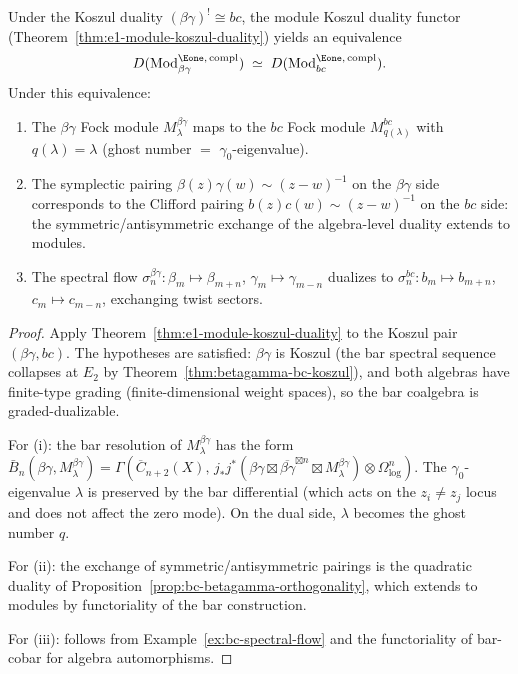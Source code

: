 \begin{proposition}
\label{prop:bg-bc-module-kd}
Under the Koszul duality $(\beta\gamma)^! \cong bc$, the
module Koszul duality functor
\textup{(}Theorem~\textup{\ref{thm:e1-module-koszul-duality})}
yields an equivalence
\begin{equation}\label{eq:bg-bc-module-equiv}
D(\mathrm{Mod}^{\Eone,\,\mathrm{compl}}_{\beta\gamma})
\;\simeq\;
D(\mathrm{Mod}^{\Eone,\,\mathrm{compl}}_{bc}).
\end{equation}
Under this equivalence:
\begin{enumerate}[label=\textup{(\roman*)}]
\item The $\beta\gamma$ Fock module $M_\lambda^{\beta\gamma}$
 maps to the $bc$ Fock module $M_{q(\lambda)}^{bc}$ with
 $q(\lambda) = \lambda$ \textup{(}ghost number
 $=$ $\gamma_0$-eigenvalue\textup{)}.
\item The symplectic pairing
 $\beta(z)\gamma(w) \sim (z-w)^{-1}$ on the $\beta\gamma$ side
 corresponds to the Clifford pairing
 $b(z)c(w) \sim (z-w)^{-1}$ on the $bc$ side: the
 symmetric/antisymmetric exchange of the algebra-level duality
 extends to modules.
\item The spectral flow
 $\sigma_n^{\beta\gamma}: \beta_m \mapsto \beta_{m+n}$,
 $\gamma_m \mapsto \gamma_{m-n}$ dualizes to
 $\sigma_n^{bc}: b_m \mapsto b_{m+n}$,
 $c_m \mapsto c_{m-n}$, exchanging twist sectors.
\end{enumerate}
\end{proposition}

\begin{proof}
Apply Theorem~\ref{thm:e1-module-koszul-duality} to the
Koszul pair $(\beta\gamma, bc)$. The hypotheses are satisfied:
$\beta\gamma$ is Koszul (the bar spectral sequence collapses
at $E_2$ by Theorem~\ref{thm:betagamma-bc-koszul}), and
both algebras have finite-type grading (finite-dimensional
weight spaces), so the bar coalgebra is graded-dualizable.

For (i): the bar resolution of $M_\lambda^{\beta\gamma}$
has the form
$\bar{B}_n(\beta\gamma, M_\lambda^{\beta\gamma})
= \Gamma(\overline{C}_{n+2}(X),\,
j_*j^*(\beta\gamma \boxtimes
\overline{\beta\gamma}^{\boxtimes n} \boxtimes
M_\lambda^{\beta\gamma}) \otimes \Omega^n_{\log})$.
The $\gamma_0$-eigenvalue $\lambda$ is preserved by the
bar differential (which acts on the
$z_i \neq z_j$ locus and does not affect the zero mode).
On the dual side, $\lambda$ becomes the ghost number $q$.

For (ii): the exchange of symmetric/antisymmetric pairings
is the quadratic duality of Proposition~\ref{prop:bc-betagamma-orthogonality},
which extends to modules by functoriality of the bar construction.

For (iii): follows from Example~\ref{ex:bc-spectral-flow} and
the functoriality of bar-cobar for algebra automorphisms.
\end{proof}

